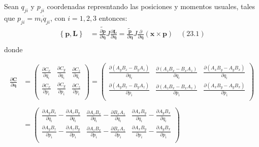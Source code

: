 \documentclass[a4paper]{article}
\begin{document}
    \begin{answer}[Punto 23]
    Sean $q_{ji}$ y $p_{ji}$ coordenadas represntando las posiciones y momentos usuales, tales que $p_{ji} = m_i \dot q_{ji} $, con $i = 1,2,3$ entonces:
    \begin{align*}
        \left\{\mathbf{p}, \mathbf{L}\right\} &=  \tilde{\frac{\partial \mathbf p}{\partial \pmb \eta}}  { J {\frac{\partial \mathbf L}{\partial \pmb \eta}} }=\tilde{\frac{\mathbf p}{\partial \pmb \eta}}J  {{\frac{\partial}{\partial \pmb \eta}}}\left(\mathbf x \times \mathbf p\right)  \quad (23.1)\\
    \end{align*}
    donde 

    \begin{align*}
        \frac{\partial \mathbf C}{\partial \pmb \eta} &= \begin{pmatrix}
            \frac{\partial  C_x}{\partial q_{i}}  &  \frac{\partial  C_y}{\partial q_{i}}  &  \frac{\partial  C_z}{\partial q_{i}}  \\
              \frac{\partial  C_x}{\partial p_{i}}  &  \frac{\partial  C_y}{\partial p_{i}}  &  \frac{\partial  C_z}{\partial p_{i}}  \\
        \end{pmatrix} =
        \begin{pmatrix}
            \frac{\partial  (A_y B_z - B_y A_z)}{\partial q_{i}}  &  \frac{\partial  (A_z B_x - B_x A_z)}{\partial q_{i}}  &  \frac{\partial  (A_x B_y - A_y B_x)}{\partial q_{i}}  \\
                \frac{\partial  (A_y B_z - B_y A_z)}{\partial p_{i}}  &  \frac{\partial  (A_z B_x - B_x A_z)}{\partial p_{i}}  &  \frac{\partial  (A_x B_y - A_y B_x)}{\partial p_{i}}  \\
        \end{pmatrix}\\\\
        &= \begin{pmatrix}
            \frac{\partial  A_y B_z}{\partial q_{i}}  - \frac{\partial  A_z B_y}{\partial q_{i}}  &  \frac{\partial  A_z B_x}{\partial q_{i}}  - \frac{\partial  B_x A_z}{\partial q_{i}}  &  \frac{\partial  A_x B_y}{\partial q_{i}}  - \frac{\partial  A_y B_x}{\partial q_{i}}  \\
                \frac{\partial  A_y B_z}{\partial p_{i}}  - \frac{\partial  A_z B_y}{\partial p_{i}}  &  \frac{\partial  A_z B_x}{\partial p_{i}}  - \frac{\partial  B_x A_z}{\partial p_{i}}  &  \frac{\partial  A_x B_y}{\partial p_{i}}  - \frac{\partial  A_y B_x}{\partial p_{i}}  \\

\end{pmatrix}
\end{align*}
\end{answer}
\end{document}

